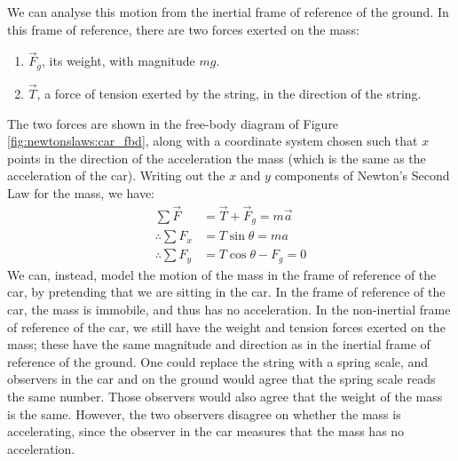 We can analyse this motion from the inertial frame of reference of the ground. In this frame of reference, there are two forces exerted on the mass:
\begin{enumerate}
\item $\vec F_g$, its weight, with magnitude $mg$.
\item $\vec T$, a force of tension exerted by the string, in the direction of the string.
\end{enumerate}
The two forces are shown in the free-body diagram of Figure \ref{fig:newtonslaws:car_fbd}, along with a coordinate system chosen such that $x$ points in the direction of the acceleration the mass (which is the same as the acceleration of the car). 
Writing out the $x$ and $y$ components of Newton's Second Law for the mass, we have:
\begin{align*}
\sum \vec F &= \vec T + \vec F_g= m \vec a\\
\therefore\sum F_x &= T\sin\theta = ma\\
\therefore\sum F_y &= T\cos\theta-F_g=0
\end{align*}
We can, instead, model the motion of the mass in the frame of reference of the car, by pretending that we are sitting in the car. In the frame of reference of the car, the mass is immobile, and thus has no acceleration. In the non-inertial frame of reference of the car, we still have the weight and tension forces exerted on the mass; these have the same magnitude and direction as in the inertial frame of reference of the ground. One could replace the string with a spring scale, and observers in the car and on the ground would agree that the spring scale reads the same number. Those observers would also agree that the weight of the mass is the same. However, the two observers disagree on whether the mass is accelerating, since the observer in the car measures that the mass has no acceleration.

